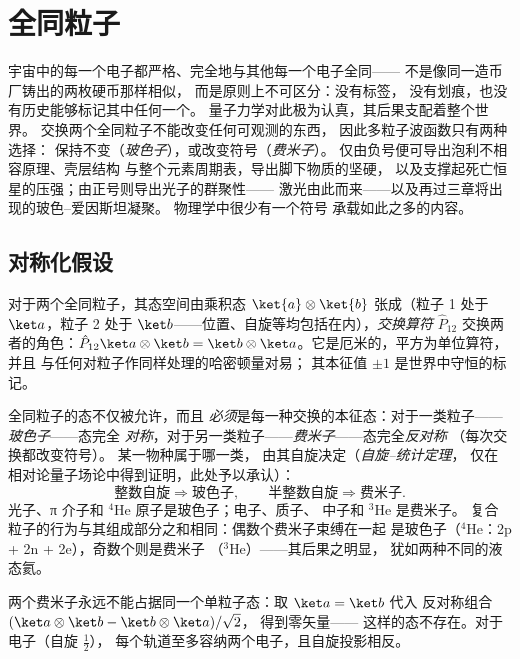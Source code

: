 \chapter{全同粒子}\label{ch:b3:identical-particles}

宇宙中的每一个电子都严格、完全地与其他每一个电子全同——
不是像同一造币厂铸出的两枚硬币那样相似，
而是原则上不可区分：没有标签，
没有划痕，也没有历史能够标记其中任何一个。
量子力学对此极为认真，其后果支配着整个世界。
交换两个全同粒子不能改变任何可观测的东西，
因此多粒子波函数只有两种选择：
保持不变（\emph{玻色子}），或改变符号（\emph{费米子}）。
仅由负号便可导出泡利不相容原理、壳层结构
与整个元素周期表，导出脚下物质的坚硬，
以及支撑起死亡恒星的压强；由正号则导出光子的群聚性——
激光由此而来——以及再过三章将出现的玻色–爱因斯坦凝聚。
物理学中很少有一个符号
承载如此之多的内容。

\section{对称化假设}

\begin{definition}[交换]\label{def:b3:identical-particles:exchange}
对于两个全同粒子，其态空间由乘积态
$\ket{a}\otimes\ket{b}$ 张成（粒子 1 处于 $\ket a$，粒子 2 处于
$\ket b$——位置、自旋等均包括在内），\emph{交换算符}
$\hat P_{12}$ 交换两者的角色：$\hat P_{12}\ket a\otimes\ket b =
\ket b\otimes\ket a$。它是厄米的，平方为单位算符，并且
与任何对粒子作同样处理的哈密顿量对易；
其本征值 $\pm1$ 是世界中守恒的标记。
\end{definition}

\begin{theorem}[玻色子与费米子]\label{thm:b3:identical-particles:postulate}
全同粒子的态不仅被允许，而且
\emph{必须}是每一种交换的本征态：对于一类粒子——\emph{玻色子}——态完全
\emph{对称}，对于另一类粒子——\emph{费米子}——态完全\emph{反对称}
（每次交换都改变符号）。
某一物种属于哪一类，
由其自旋决定（\emph{自旋–统计定理}，
仅在相对论量子场论中得到证明，此处予以承认）：
\[
\text{整数自旋} \Rightarrow \text{玻色子} , \qquad
\text{半整数自旋} \Rightarrow \text{费米子} .
\]
光子、π 介子和 $^4$He 原子是玻色子；电子、质子、
中子和 $^3$He 是费米子。
复合粒子的行为与其组成部分之和相同：偶数个费米子束缚在一起
是玻色子（$^4$He：2p + 2n + 2e），奇数个则是费米子
（$^3$He）——其后果之明显，
犹如两种不同的液态氦。
\end{theorem}
\admitted

\begin{corollary}[泡利不相容原理]\label{cor:b3:identical-particles:pauli}
两个费米子永远不能占据同一个单粒子态：取 $\ket a = \ket b$ 代入
反对称组合 $(\ket a\otimes\ket b - \ket b\otimes\ket a)/\sqrt2$，
得到零矢量——
这样的态不存在。对于电子（自旋 $\tfrac12$），
每个轨道至多容纳两个电子，且自旋投影相反。
\end{corollary}


